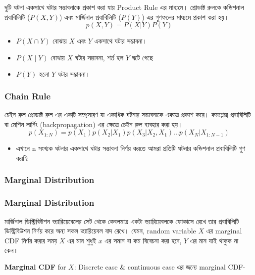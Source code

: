 \documentclass[graybox, envcountchap, twocolumn]{styles/svmult}
\begin{document}
 {\bengalifont দুটি ঘটনা একসাথে ঘটার সম্ভাবনাকে প্রকাশ করা যায় Product Rule এর মাধ্যমে।  প্রোডাক্ট রুলকে কন্ডিশনাল প্রবাবিলিটি ($P(X,Y)$) এবং মার্জিনাল প্রবাবিলিটি ($P(Y)$) এর গুণফলের মাধ্যমে প্রকাশ করা হয়।   }
\begin{equation}\label{eqn:product-rule}
p(X,Y) = P(X|Y) P(Y)
\end{equation}
\begin{itemize} 
    \item $P(X \cap Y)$ {\bengalifont বোঝায় $X$ এবং $Y$ একসাথে ঘটার সম্ভাবনা।} 
    \item $P(X \mid Y)$ {\bengalifont বোঝায় $X$ ঘটার সম্ভাবনা, শর্ত হল $Y$  ঘটে গেছে } 
    \item $P(Y)$ {\bengalifont হলো $Y$ ঘটার সম্ভাবনা।} \end{itemize}


\subsubsection{Chain Rule}
{\bengalifont চেইন রুল প্রোডাক্ট রুল এর একটি সম্প্রসারণ যা একাধিক ঘটনার সম্ভাবনাকে একত্রে প্রকাশ করে। কমপ্লেক্স প্রবাবিলিটি বা মেশিন লার্নিং (backpropagation) এর ক্ষেত্রে চেইন রুল ব্যবহার করা হয়। }
\begin{equation}
p(X_{1:N}) = p(X_1)p(X_2|X_1)p(X_3|X_2,X_1)...p(X_N|X_{1:N-1})
\label{eq:1}
\end{equation}

\begin{itemize}
    \item {\bengalifont এখানে 
    n সংখ্যক ঘটনার একসাথে ঘটার সম্ভাবনা নির্ণয় করতে আমরা প্রতিটি ঘটনার কন্ডিশনাল প্রবাবিলিটি গুণ করছি }
\end{itemize}

\subsubsection{Marginal Distribution}
\subsubsection{Marginal Distribution} {\bengalifont মার্জিনাল ডিস্ট্রিবিউশন ভ্যারিয়েবেলের সেট থেকে কেবলমাত্র একটা ভ্যারিয়েবলকে ফোকাসে রেখে তার প্রবাবিলিটি ডিস্ট্রিবিউশন নির্ণয় করে অন্য সকল ভ্যারিয়েবল বাদ রেখে।  যেমন, random variable $X$ এর marginal CDF নির্ণয় করার সময় $X$ এর মান শুধুই $x$ এর সমান বা কম বিবেচনা করা হবে, $Y$ এর মান যাই  থাকুক না কেন।  }

\textbf{Marginal CDF} for $X$:
{\bengalifont Discrete case & continuous case এর জন্যে marginal  CDF-  }
\end{document}
